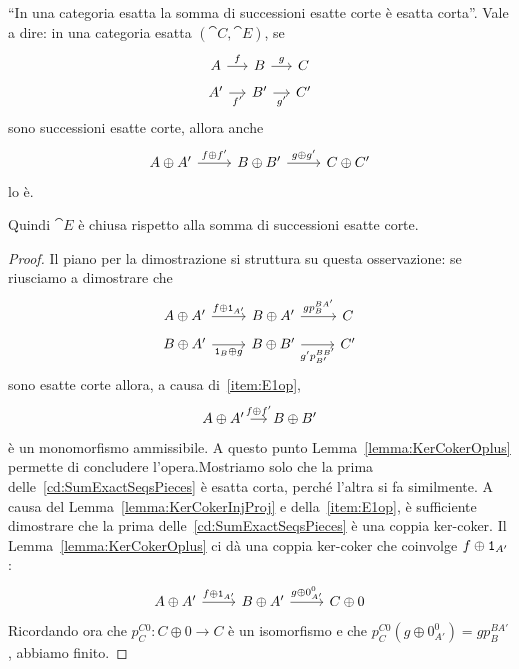 \begin{proposition}\label{proposition:SumExactSeqsIsExact}
  ``In una categoria esatta la somma di successioni esatte corte è
  esatta corta''. Vale a dire: in una categoria esatta
  \((\cat C,\cat E)\), se
  \[
    \begin{tikzcd}[row sep=tiny, column sep=small]
      A \ar["{f}", r] & B \ar["{g}", r] & C \\
      A' \ar["{f'}", r, swap] & B' \ar["{g'}", r, swap] & C'
    \end{tikzcd}
  \]
  sono successioni esatte corte, allora anche
  \begin{equation}
    \label{cd:SumExactSeqs}
    \begin{tikzcd}[row sep=small]
      A \oplus A' \ar["{f \oplus f'}", r] & B \oplus B' \ar["{g \oplus
        g'}", r] & C \oplus C'
    \end{tikzcd}
  \end{equation}
  lo è.
\end{proposition}

Quindi \(\cat E\) è chiusa rispetto alla somma di successioni esatte
corte.

\begin{proof}
  Il piano per la dimostrazione si struttura su questa osservazione: se
  riusciamo a dimostrare che
  \begin{equation}
    \begin{tikzcd}[row sep=tiny]
      A \oplus A' \ar["{f \oplus \id_{A'}}", r] & B \oplus A' \ar["{g
        p_{B}^{BA'}}",
      r] & C \\
      B \oplus A' \ar["{\id_B \oplus g}", r, swap] & B \oplus B'
      \ar["{g' p_{B'}^{BB'}}", r, swap] & C'
    \end{tikzcd}
    \label{cd:SumExactSeqsPieces}
  \end{equation}
  sono esatte corte allora, a causa di~\ref{item:E1op},
  \[
    \begin{tikzcd}[column sep=small, row sep=tiny]
      A \oplus A' \ar["{f \oplus f'}", r] & B \oplus B'
    \end{tikzcd}
  \]
  è un monomorfismo ammissibile.  A questo punto
  Lemma~\ref{lemma:KerCokerOplus} permette di concludere
  l'opera.\newline Mostriamo solo che la prima
  delle~\eqref{cd:SumExactSeqsPieces} è esatta corta, perché l'altra si
  fa similmente. A causa del Lemma~\ref{lemma:KerCokerInjProj} e
  della~\ref{item:E1op}, è sufficiente dimostrare che la prima
  delle~\ref{cd:SumExactSeqsPieces} è una coppia ker-coker. Il
  Lemma~\ref{lemma:KerCokerOplus} ci dà una coppia ker-coker che
  coinvolge \(f \oplus \mathtt 1_{A'}\):
  \[
    \begin{tikzcd}
      A \oplus A' \ar["{f \oplus \id_{A'}}", r] & B \oplus A' \ar["{g
        \oplus 0_{A'}^0}", r] & C \oplus 0
    \end{tikzcd}
  \]
  Ricordando ora che \(p_{C}^{C0} : C \oplus 0 \to C\) è un isomorfismo
  e che \(p_{C}^{C0} \left( g \oplus 0_{A'}^0 \right) = g p_{B}^{BA'}\),
  abbiamo finito.
\end{proof}

